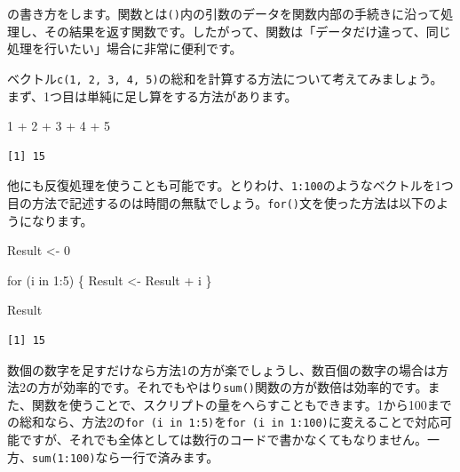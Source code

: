 \documentclass[
  a4paper,
  pandoc,
  ja=standard,
  jafont=haranoaji]{bxjsbook}
\newenvironment{Shaded}{\begin{snugshade}}{\end{snugshade}}
\newcommand{\ControlFlowTok}[1]{\textcolor[rgb]{0.00,0.48,0.65}{#1}}
\newcommand{\DecValTok}[1]{\textcolor[rgb]{0.68,0.00,0.00}{#1}}
\newcommand{\NormalTok}[1]{\textcolor[rgb]{0.00,0.48,0.65}{#1}}
\newcommand{\OtherTok}[1]{\textcolor[rgb]{0.00,0.48,0.65}{#1}}
\newcommand{\SpecialCharTok}[1]{\textcolor[rgb]{0.37,0.37,0.37}{#1}}
\begin{document}
の書き方をします。関数とは\texttt{()}内の引数のデータを関数内部の手続きに沿って処理し、その結果を返す関数です。したがって、関数は「データだけ違って、同じ処理を行いたい」場合に非常に便利です。

ベクトル\texttt{c(1,\ 2,\ 3,\ 4,\ 5)}の総和を計算する方法について考えてみましょう。まず、1つ目は単純に足し算をする方法があります。

\begin{Shaded}
\begin{Highlighting}[numbers=left,,]
\DecValTok{1} \SpecialCharTok{+} \DecValTok{2} \SpecialCharTok{+} \DecValTok{3} \SpecialCharTok{+} \DecValTok{4} \SpecialCharTok{+} \DecValTok{5}
\end{Highlighting}
\end{Shaded}

\begin{verbatim}
[1] 15
\end{verbatim}

他にも反復処理を使うことも可能です。とりわけ、\texttt{1:100}のようなベクトルを1つ目の方法で記述するのは時間の無駄でしょう。\texttt{for()}文を使った方法は以下のようになります。

\begin{Shaded}
\begin{Highlighting}[numbers=left,,]
\NormalTok{Result }\OtherTok{\textless{}{-}} \DecValTok{0}

\ControlFlowTok{for}\NormalTok{ (i }\ControlFlowTok{in} \DecValTok{1}\SpecialCharTok{:}\DecValTok{5}\NormalTok{) \{}
\NormalTok{  Result }\OtherTok{\textless{}{-}}\NormalTok{ Result }\SpecialCharTok{+}\NormalTok{ i  }
\NormalTok{\}}
\end{Highlighting}
\end{Shaded}

\begin{Shaded}
\begin{Highlighting}[numbers=left,,]
\NormalTok{Result}
\end{Highlighting}
\end{Shaded}

\begin{verbatim}
[1] 15
\end{verbatim}

数個の数字を足すだけなら方法1の方が楽でしょうし、数百個の数字の場合は方法2の方が効率的です。それでもやはり\texttt{sum()}関数の方が数倍は効率的です。また、関数を使うことで、スクリプトの量をへらすこともできます。1から100までの総和なら、方法2の\texttt{for\ (i\ in\ 1:5)}を\texttt{for\ (i\ in\ 1:100)}に変えることで対応可能ですが、それでも全体としては数行のコードで書かなくてもなりません。一方、\texttt{sum(1:100)}なら一行で済みます。
\end{document}
